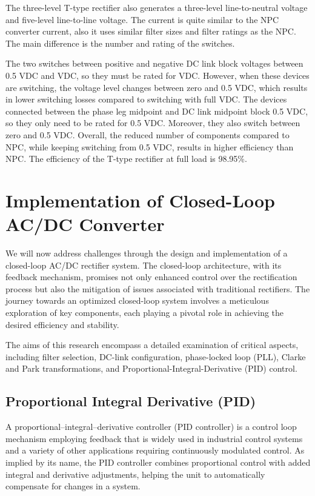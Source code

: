 \documentclass[12pt,a4paper]{book}
\begin{document}
The three-level T-type rectifier also generates a three-level line-to-neutral voltage and five-level line-to-line voltage. The current is quite similar to the NPC converter current, also it uses similar filter sizes and filter ratings as the NPC. The main difference is the number and rating of the switches. 

The two switches between positive and negative DC link block voltages between 0.5 VDC and VDC, so they must be rated for VDC. However, when these devices are switching, the voltage level changes between zero and 0.5 VDC, which results in lower switching losses compared to switching with full VDC. The devices connected between the phase leg midpoint and DC link midpoint block 0.5 VDC, so they only need to be rated for 0.5 VDC. Moreover, they also switch between zero and 0.5 VDC. Overall, the reduced number of components compared to NPC, while keeping switching from 0.5 VDC, results in higher efficiency than NPC. The efficiency of the T-type rectifier at full load is 98.95\%.

\chapter{Implementation of Closed-Loop AC/DC Converter}
We will now address challenges through the design and implementation of a closed-loop AC/DC rectifier system. The closed-loop architecture, with its feedback mechanism, promises not only enhanced control over the rectification process but also the mitigation of issues associated with traditional rectifiers. The journey towards an optimized closed-loop system involves a meticulous exploration of key components, each playing a pivotal role in achieving the desired efficiency and stability.

The aims of this research encompass a detailed examination of critical aspects, including filter selection, DC-link configuration, phase-locked loop (PLL), Clarke and Park transformations, and Proportional-Integral-Derivative (PID) control. 

\section{Proportional Integral Derivative (PID)}
A proportional–integral–derivative controller (PID controller) is a control loop mechanism employing feedback that is widely used in industrial control systems and a variety of other applications requiring continuously modulated control. As implied by its name, the PID controller combines proportional control with added integral and derivative adjustments, helping the unit to automatically compensate for changes in a system. 
\end{document}
